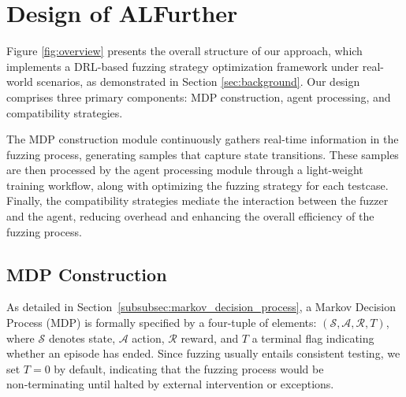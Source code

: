 \documentclass[lettersize,journal]{IEEEtran}
\begin{document}
\section{Design of ALFurther}\label{sec:method}

Figure \ref{fig:overview} presents the overall structure of our approach, which implements a DRL-based fuzzing strategy optimization framework under real-world scenarios, as demonstrated in Section \ref{sec:background}. Our design comprises three primary components: MDP construction, agent processing, and compatibility strategies.

The MDP construction module continuously gathers real-time information in the fuzzing process, generating samples that capture state transitions. These samples are then processed by the agent processing module through a light-weight training workflow, along with optimizing the fuzzing strategy for each testcase. Finally, the compatibility strategies mediate the interaction between the fuzzer and the agent, reducing overhead and enhancing the overall efficiency of the fuzzing process.


\subsection{MDP Construction}\label{subsec:mdp_construction}

As detailed in Section \ref{subsubsec:markov_decision_process}, a Markov Decision Process (MDP) is formally specified by a four-tuple of elements: $(\mathcal{S}, \mathcal{A}, \mathcal{R}, T)$, where $\mathcal{S}$ denotes state, $\mathcal{A}$ action, $\mathcal{R}$ reward, and $T$ a terminal flag indicating whether an episode has ended. Since fuzzing usually entails consistent testing, we set $T=0$ by default, indicating that the fuzzing process would be non‑terminating until halted by external intervention or exceptions.
\end{document}
